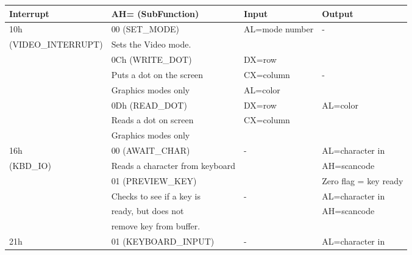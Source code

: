 \begin{figure}[h]
\hskip-1.5cm%
\begin{tabular}{| p{4cm} | p{4.5cm} | p{4cm} | p{3.5cm} |}
\hline
\textbf{Interrupt}                & \textbf{AH= (SubFunction)}       & \textbf{Input}            & \textbf{Output}         \\
\hline
10h 					 & 00 (SET\_MODE)    &AL=mode number     & -                                \\
(VIDEO\_INTERRUPT)      & Sets the Video mode.      &                                  &       			        \\
\cline{2-4} 
                                           & 0Ch (WRITE\_DOT)        & DX=row  &\\
                                           & Puts a dot on the screen & CX=column   & - \\
                                           & Graphics modes only      &  AL=color   &\\                                                                                                                     \cline{2-4}     			 
                                           & 0Dh (READ\_DOT)         & DX=row        	    & AL=color     \\                                                                            
                                           & Reads a dot on screen   & CX=column & \\
                                           & Graphics modes only      & &\\
\hline                                        
16h 		               & 00 (AWAIT\_CHAR)  		       & -       & AL=character in \\
(KBD\_IO) 	       & Reads a character from keyboard &		  & AH=scancode \\
\cline{2-4} 		       
			       & 01 (PREVIEW\_KEY) 		      &          & Zero flag = key ready \\ 
			       & Checks to see if a key is      & - 	 & AL=character in \\
			       & ready, but does not  &		 & AH=scancode \\
			       & remove key from buffer. & &\\
\hline
21h   			 & 01 (KEYBOARD\_INPUT)               & -       & AL=character in \\      

\end{tabular}
\end{figure}
